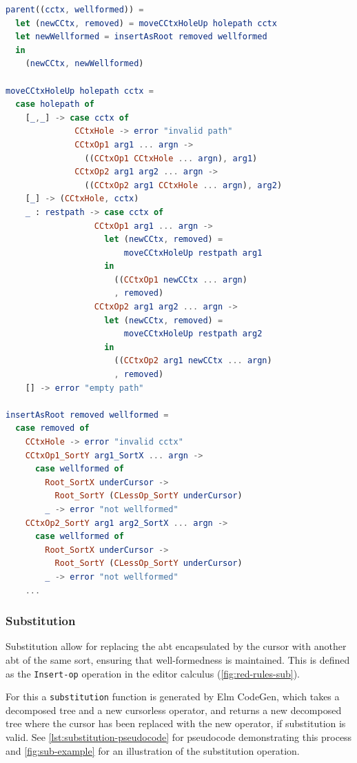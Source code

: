 \begin{lstlisting}[style=inline,caption={Pseudocode for applying parent operator},language=elm,label={lst:cursor-movement-parent-pseudocode}]
parent((cctx, wellformed)) =
  let (newCCtx, removed) = moveCCtxHoleUp holepath cctx
  let newWellformed = insertAsRoot removed wellformed
  in
    (newCCtx, newWellformed)

moveCCtxHoleUp holepath cctx =
  case holepath of
    [_,_] -> case cctx of
              CCtxHole -> error "invalid path"
              CCtxOp1 arg1 ... argn -> 
                ((CCtxOp1 CCtxHole ... argn), arg1)
              CCtxOp2 arg1 arg2 ... argn -> 
                ((CCtxOp2 arg1 CCtxHole ... argn), arg2)
    [_] -> (CCtxHole, cctx)
    _ : restpath -> case cctx of
                  CCtxOp1 arg1 ... argn ->
                    let (newCCtx, removed) = 
                        moveCCtxHoleUp restpath arg1
                    in
                      ((CCtxOp1 newCCtx ... argn)
                      , removed)
                  CCtxOp2 arg1 arg2 ... argn ->
                    let (newCCtx, removed) = 
                        moveCCtxHoleUp restpath arg2
                    in
                      ((CCtxOp2 arg1 newCCtx ... argn)
                      , removed)
    [] -> error "empty path" 

insertAsRoot removed wellformed =
  case removed of
    CCtxHole -> error "invalid cctx"
    CCtxOp1_SortY arg1_SortX ... argn -> 
      case wellformed of
        Root_SortX underCursor ->
          Root_SortY (CLessOp_SortY underCursor)
        _ -> error "not wellformed"
    CCtxOp2_SortY arg1 arg2_SortX ... argn ->
      case wellformed of
        Root_SortX underCursor ->
          Root_SortY (CLessOp_SortY underCursor)
        _ -> error "not wellformed"
    ...
\end{lstlisting}

\subsubsection{Substitution}
Substitution allow for replacing the abt encapsulated by the cursor with another
abt of the same sort, ensuring that well-formedness is maintained.
This is defined as the \texttt{Insert-op} operation in the editor calculus
(\cref{fig:red-rules-sub}).

For this a \texttt{substitution} function is generated by Elm CodeGen, which
takes a decomposed tree and a new cursorless operator, and returns a new
decomposed tree where the cursor has been replaced with the new operator,
if substitution is valid. See \cref{lst:substitution-pseudocode} for pseudocode
demonstrating this process and \cref{fig:sub-example} for an illustration of
the substitution operation.

